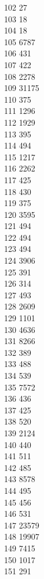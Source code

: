 { 102	27 \\
 103	18 \\
 104	18 \\
 105	6787 \\
 106	431 \\
 107	422 \\
 108	2278 \\
 109	31175 \\
 110	375 \\
 111	1296 \\
 112	1929 \\
 113	395 \\
 114	494 \\
 115	1217 \\
 116	2262 \\
 117	425 \\
 118	430 \\
 119	375 \\
 120	3595 \\
 121	494 \\
 122	494 \\
 123	494 \\
 124	3906 \\
 125	391 \\
 126	314 \\
 127	493 \\
 128	2609 \\
 129	1101 \\
 130	4636 \\
 131	8266 \\
 132	389 \\
 133	488 \\
 134	539 \\
 135	7572 \\
 136	436 \\
 137	425 \\
 138	520 \\
 139	2124 \\
 140	440 \\
 141	511 \\
 142	485 \\
 143	8578 \\
 144	495 \\
 145	456 \\
 146	531 \\
 147	23579 \\
 148	19907 \\
 149	7415 \\
 150	1017 \\
 151	291 \\
}
